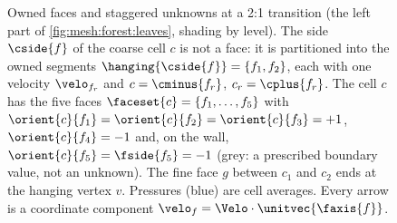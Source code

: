 \begin{figure}
  \caption{Owned faces and staggered unknowns at a 2:1 transition (the
    left part of \cref{fig:mesh:forest:leaves}, shading by level). The side
    $\cside{f}$ of the coarse cell $c$ is not a face: it is partitioned into
    the owned segments $\hanging{\cside{f}}=\{f_1,f_2\}$, each with one
    velocity $\velo_{f_r}$ and $c=\cminus{f_r}$, $c_r=\cplus{f_r}$. The cell
    $c$ has the five faces $\faceset{c}=\{f_1,\dots,f_5\}$ with
    $\orient{c}{f_1}=\orient{c}{f_2}=\orient{c}{f_3}=+1$,
    $\orient{c}{f_4}=-1$ and, on the wall, $\orient{c}{f_5}=\fside{f_5}=-1$
    (grey: a prescribed boundary value, not an unknown). The fine face $g$
    between $c_1$ and $c_2$ ends at the hanging vertex $v$. Pressures (blue)
    are cell averages. Every arrow is a coordinate component
    $\velo_f=\Velo\cdot\unitvec{\faxis{f}}$.}
  \label{fig:mesh:hanging}
\end{figure}
